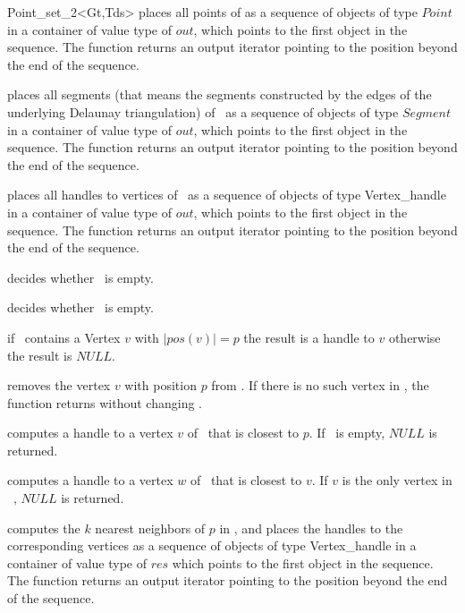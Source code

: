 \begin{ccRefClass}{Point_set_2<Gt,Tds>}
{ places all points of \ccVar as a sequence of objects of type
$Point$ in a container of value type of  $out$,
which points to the first object in the sequence. The function
returns an output iterator pointing to the position beyond the end
of the sequence.} 

{ places all segments (that means the segments constructed by the edges of the underlying
Delaunay triangulation)
of \ccVar\ as a sequence of objects of type
$Segment$ in a container of value type of $out$,
which points to the first object in the sequence. The function
returns an output iterator pointing to the position beyond the end
of the sequence.} 

\ccHtmlLinksOff

{ places all handles to vertices of \ccVar\ as a sequence of objects of type
Vertex\_handle in a container of value type of $out$,
which points to the first object in the sequence. The function
returns an output iterator pointing to the position beyond the end
of the sequence.} 

\ccHtmlLinksOn

{ decides whether \ccVar\ is empty. }

{ decides whether \ccVar\ is empty. }


\ccHtmlLinksOff

{ if \ccVar\ contains a Vertex $v$ with $|pos(v)| = p$ 
the result is a handle to $v$ otherwise the result is $NULL$. }

{ removes the vertex $v$ with position $p$ from \ccVar. If there is
no such vertex in \ccVar, the function returns without changing \ccVar. }

{ computes a handle to a vertex $v$ of \ccVar\ that is closest to $p$.
If \ccVar\ is empty, $NULL$ is returned.
}

{ computes a handle to a vertex $w$ of \ccVar\ that is closest to $v$.
If $v$ is the only vertex in \ccVar\ , $NULL$ is returned.
}

{ computes the $k$ nearest neighbors of $p$ in \ccVar, and places the
handles to the corresponding vertices as a sequence of objects of type
Vertex\_handle in a container of value type of $res$
which points to the first object in the sequence. The function
returns an output iterator pointing to the position beyond the end
of the sequence. }


\end{ccRefClass}
